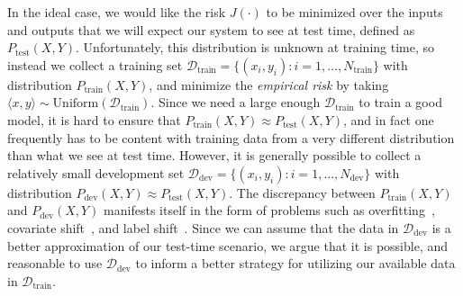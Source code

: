 In the ideal case, we would like the risk $J(\cdot)$ to be minimized over the inputs and outputs that we will expect our system to see at test time, defined as $P_{\text{test}}(X,Y)$.
Unfortunately, this distribution is unknown at training time, so instead we collect a training set $\mathcal{D}_\text{train} = \{(x_i, y_i): i = 1, ..., N_\text{train}\}$ with distribution $P_\text{train}(X, Y)$, and minimize the \emph{empirical risk} by taking $\langle x, y \rangle \sim \text{Uniform}(\mathcal{D}_\text{train})$.
Since we need a large enough $\mathcal{D}_\text{train}$ to train a good model, it is hard to ensure that $P_\text{train}(X, Y) \approx P_{\text{test}}(X, Y)$, and in fact one frequently has to be content with training data from a very different distribution than what we see at test time.
However, it is generally possible to collect a relatively small development set $\mathcal{D}_\text{dev}= \{(x_i, y_i): i = 1, ..., N_\text{dev}\}$ with distribution $P_{\text{dev}}(X, Y) \approx P_{\text{test}}(X, Y)$.
The discrepancy between $P_\text{train}(X, Y)$ and $P_\text{dev}(X, Y)$ manifests itself in the form of problems such as overfitting~\citep{overfit_random_examples,dropout}, covariate shift~\citep{shimodaira2000improving}, and label shift~\citep{lipton2018detecting}.
Since we can assume that the data in $\mathcal{D}_\text{dev}$ is a better approximation of our test-time scenario, we argue that it is possible, and reasonable to use $\mathcal{D}_\text{dev}$ to inform a better strategy for utilizing our available data in $\mathcal{D}_\text{train}$.


